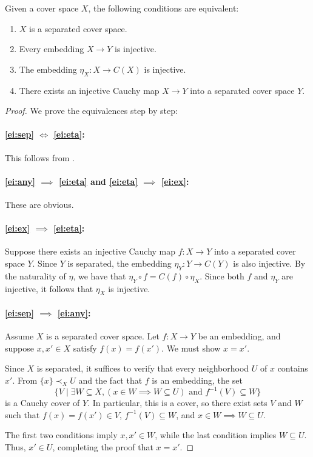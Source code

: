\documentclass[reqno]{amsart}
\theoremstyle{definition}
\theoremstyle{remark}
\numberwithin{figure}{section}
\newcommand{\rb}{\prec}
\begin{document}
\begin{prop}
Given a cover space $X$, the following conditions are equivalent:
\begin{enumerate}
\item \label{ei:sep} $X$ is a separated cover space.
\item \label{ei:any} Every embedding $X \to Y$ is injective.
\item \label{ei:eta} The embedding $\eta_X : X \to C(X)$ is injective.
\item \label{ei:ex} There exists an injective Cauchy map $X \to Y$ into a separated cover space $Y$.
\end{enumerate}
\end{prop}
\begin{proof}
We prove the equivalences step by step:

\paragraph{\eqref{ei:sep} $\iff$ \eqref{ei:eta}:} This follows from .

\paragraph{\eqref{ei:any} $\implies$ \eqref{ei:eta} and \eqref{ei:eta} $\implies$ \eqref{ei:ex}:} These are obvious.

\paragraph{\eqref{ei:ex} $\implies$ \eqref{ei:eta}:}
Suppose there exists an injective Cauchy map $f : X \to Y$ into a separated cover space $Y$.
Since $Y$ is separated, the embedding $\eta_Y : Y \to C(Y)$ is also injective.
By the naturality of $\eta$, we have that $\eta_Y \circ f = C(f) \circ \eta_X$.
Since both $f$ and $\eta_Y$ are injective, it follows that $\eta_X$ is injective.

\paragraph{\eqref{ei:sep} $\implies$ \eqref{ei:any}:}
Assume $X$ is a separated cover space.
Let $f : X \to Y$ be an embedding, and suppose $x,x' \in X$ satisfy $f(x) = f(x')$.
We must show $x = x'$.

Since $X$ is separated, it suffices to verify that every neighborhood $U$ of $x$ contains $x'$.
From $\{x\} \rb_X U$ and the fact that $f$ is an embedding, the set 
\[
\{ V \mid \exists W \subseteq X, (x \in W \implies W \subseteq U) \text{ and } f^{-1}(V) \subseteq W \}
\]
is a Cauchy cover of $Y$.
In particular, this is a cover, so there exist sets $V$ and $W$ such that $f(x) = f(x') \in V$, $f^{-1}(V) \subseteq W$, and $x \in W \implies W \subseteq U$.

The first two conditions imply $x, x' \in W$, while the last condition implies $W \subseteq U$.
Thus, $x' \in U$, completing the proof that $x = x'$.
\end{proof}
\end{document}
